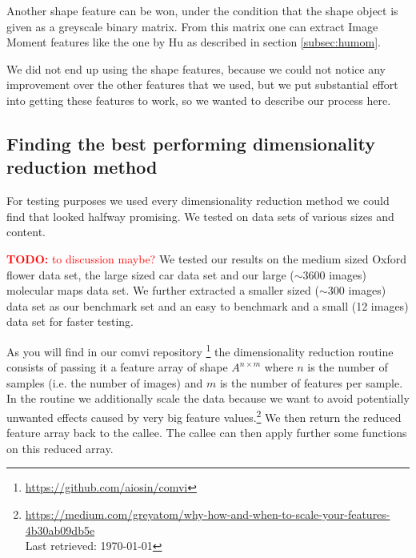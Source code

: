 \documentclass[journal]{vgtc}       %
\newcommand{\todo}[1]{\textcolor{red}{\textbf{TODO:} #1}}
\begin{document}
Another shape feature can be won, under the condition that the shape object is given as a greyscale binary matrix. From this matrix one can extract Image Moment features like the one by Hu as described in section \ref{subsec:humom}.

We did not end up using the shape features, because we could not notice any improvement over the other features that we used, but we put substantial effort into getting these features to work, so we wanted to describe our process here.




\subsection{Finding the best performing  dimensionality reduction method}\label{subsec:dimred}
For testing purposes we used every dimensionality reduction method we could find that looked halfway promising. We tested on data sets of various sizes and content.

\todo {to discussion maybe?}
We tested our results on the medium sized Oxford flower data set\cite{flower}, the large sized car  \cite{stanfordcar}data set and our large ($\sim$3600 images) molecular maps data set. 
We further extracted a smaller sized ($\sim$300 images) data set as our benchmark set  and an easy to benchmark and a small (12 images) data set for faster testing. 

As you will find in our comvi repository \footnote{\url{https://github.com/aiosin/comvi}} the dimensionality reduction routine consists of passing it a feature array of shape \(A^{n\times m}\) where \(n\) is the number of samples (i.e. the number of images) and \(m\) is the number of features per sample.
In the routine we additionally scale the data because we want to avoid potentially unwanted effects caused by very big feature values.\footnote{\url{https://medium.com/greyatom/why-how-and-when-to-scale-your-features-4b30ab09db5e} \\ Last retrieved: \today}
We then return the reduced feature array back to the callee. The callee can then apply further some functions on this reduced array.
\end{document}
